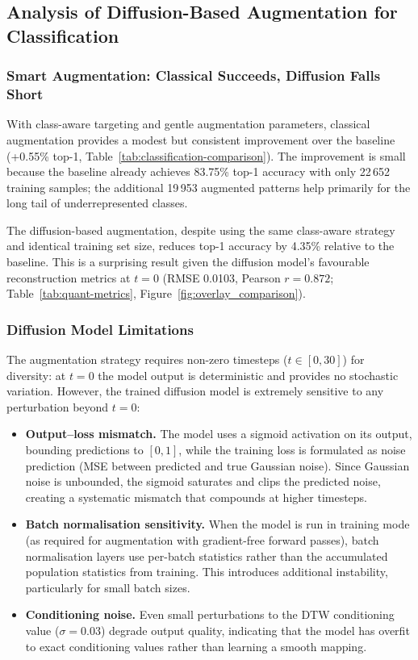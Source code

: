 \subsection{Analysis of Diffusion-Based Augmentation for Classification}

\subsubsection{Smart Augmentation: Classical Succeeds, Diffusion Falls Short}

With class-aware targeting and gentle augmentation parameters, classical augmentation provides a modest but consistent improvement over the baseline (+0.55\% top-1, Table~\ref{tab:classification-comparison}).
The improvement is small because the baseline already achieves 83.75\% top-1 accuracy with only 22\,652 training samples; the additional 19\,953 augmented patterns help primarily for the long tail of underrepresented classes.

The diffusion-based augmentation, despite using the same class-aware strategy and identical training set size, reduces top-1 accuracy by 4.35\% relative to the baseline.
This is a surprising result given the diffusion model's favourable reconstruction metrics at $t{=}0$ (RMSE 0.0103, Pearson $r = 0.872$; Table~\ref{tab:quant-metrics}, Figure~\ref{fig:overlay_comparison}).


\subsubsection{Diffusion Model Limitations}

The augmentation strategy requires non-zero timesteps ($t \in [0, 30]$) for diversity: at $t{=}0$ the model output is deterministic and provides no stochastic variation.
However, the trained diffusion model is extremely sensitive to any perturbation beyond $t{=}0$:

\begin{itemize}
    \item \textbf{Output--loss mismatch.} The model uses a sigmoid activation on its output, bounding predictions to $[0, 1]$, while the training loss is formulated as noise prediction (MSE between predicted and true Gaussian noise). Since Gaussian noise is unbounded, the sigmoid saturates and clips the predicted noise, creating a systematic mismatch that compounds at higher timesteps.
    \item \textbf{Batch normalisation sensitivity.} When the model is run in training mode (as required for augmentation with gradient-free forward passes), batch normalisation layers use per-batch statistics rather than the accumulated population statistics from training. This introduces additional instability, particularly for small batch sizes.
    \item \textbf{Conditioning noise.} Even small perturbations to the DTW conditioning value ($\sigma{=}0.03$) degrade output quality, indicating that the model has overfit to exact conditioning values rather than learning a smooth mapping.
\end{itemize}

